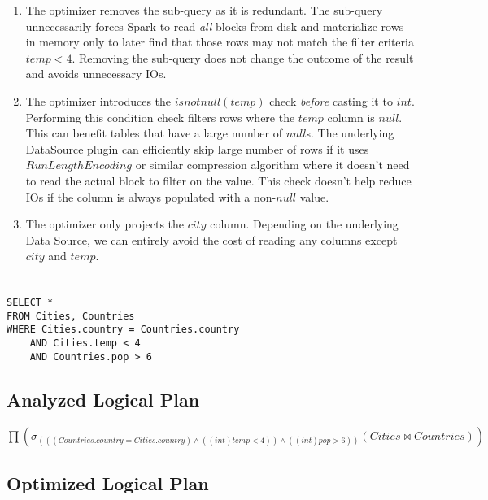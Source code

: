 \documentclass[12pt]{article}
\begin{document}
\begin{enumerate}


\item The optimizer removes the sub-query as it is redundant. The sub-query unnecessarily forces Spark to read \textit{all} blocks from disk and materialize rows in memory only to later find that those rows may not match the filter criteria $temp < 4$. Removing the sub-query does not change the outcome of the result and avoids unnecessary IOs.

\item The optimizer introduces the $isnotnull(temp)$ check \textit{before} casting it to $int$. Performing this condition check filters rows where the $temp$ column is $null$. This can benefit tables that have a large number of $null$s. The underlying DataSource plugin can efficiently skip large number of rows if it uses $Run Length Encoding$ or similar compression algorithm where it doesn't need to read the actual block to filter on the value. This check doesn't help reduce IOs if the column is always populated with a non-$null$ value.

\item The optimizer only projects the $city$ column. Depending on the underlying Data Source, we can entirely avoid the cost of reading any columns except $city$ and $temp$.

\end{enumerate}

\newpage

\section{}
\begin{verbatim}
SELECT *
FROM Cities, Countries
WHERE Cities.country = Countries.country
    AND Cities.temp < 4
    AND Countries.pop > 6
\end{verbatim}

\subsection*{Analyzed Logical Plan}

$\prod(\sigma_{(((Countries.country = Cities.country) \wedge ((int)temp < 4))  \wedge ((int)pop > 6))}(Cities \bowtie Countries))$



\subsection*{Optimized Logical Plan}
\end{document}

